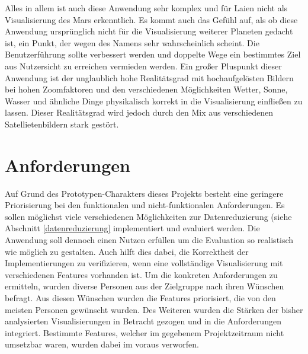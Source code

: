 Alles in allem ist auch diese Anwendung sehr komplex und für Laien nicht als Visualisierung des Mars erkenntlich. Es kommt auch das Gefühl auf, als ob diese Anwendung ursprünglich nicht für die Visualisierung weiterer Planeten gedacht ist, ein Punkt, der wegen des Namens sehr wahrscheinlich scheint. Die Benutzerführung sollte verbessert werden und doppelte Wege ein bestimmtes Ziel aus Nutzersicht zu erreichen vermieden werden. Ein großer Pluspunkt dieser Anwendung ist der unglaublich hohe Realitätsgrad mit hochaufgelösten Bildern bei hohen Zoomfaktoren und den verschiedenen Möglichkeiten Wetter, Sonne, Wasser und ähnliche Dinge physikalisch korrekt in die Visualisierung einfließen zu lassen. Dieser Realitätsgrad wird jedoch durch den Mix aus verschiedenen Satellietenbildern stark gestört.

\section{Anforderungen}
Auf Grund des Prototypen-Charakters dieses Projekts besteht eine geringere Priorisierung bei den funktionalen und nicht-funktionalen Anforderungen. Es sollen möglichst viele verschiedenen Möglichkeiten zur Datenreduzierung (siehe Abschnitt \ref{datenreduzierung} implementiert und evaluiert werden. Die Anwendung soll dennoch einen Nutzen erfüllen um die Evaluation so realistisch wie möglich zu gestalten. Auch hilft dies dabei, die Korrektheit der Implementierungen zu verifizieren, wenn eine vollständige Visualisierung mit verschiedenen Features vorhanden ist. Um die konkreten Anforderungen zu ermitteln, wurden diverse Personen aus der Zielgruppe nach ihren Wünschen befragt. Aus diesen Wünschen wurden die Features priorisiert, die von den meisten Personen gewünscht wurden. Des Weiteren wurden die Stärken der bisher analysierten Visualisierungen in Betracht gezogen und in die Anforderungen integriert. Bestimmte Features, welcher im gegebenem Projektzeitraum nicht umsetzbar waren, wurden dabei im voraus verworfen.

